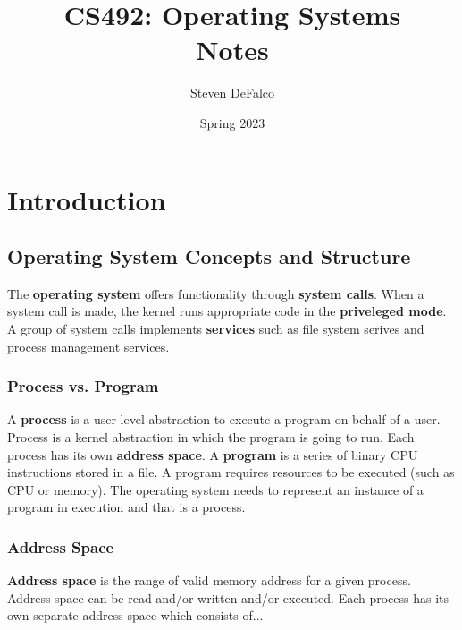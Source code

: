 \documentclass{article}
\title{CS492: Operating Systems \\ Notes}
\author{Steven DeFalco}
\date{Spring 2023}
\begin{document}
\renewcommand{\i}{\item}
\newcommand{\bl}{\begin{itemize}}
\newcommand{\el}{\end{itemize}}
\renewcommand{\b}[1]{\textbf{#1}}

\maketitle

\tableofcontents

\newpage

\section{Introduction}

\subsection{Operating System Concepts and Structure}

    The \textbf{operating system} offers functionality through \textbf{system calls}. When a system call is made, the kernel runs appropriate code in the \textbf{priveleged mode}. \\

    \noindent A group of system calls implements \textbf{services} such as file system serives and process management services. \\

    \subsubsection{Process vs. Program}

    \noindent A \textbf{process} is a user-level abstraction to execute a program on behalf of a user. Process is a kernel abstraction in which the program is going to run. Each process has its own \textbf{address space}. A \textbf{program} is a series of binary CPU instructions stored in a file. A program requires resources to be executed (such as CPU or memory). The operating system needs to represent an instance of a program in execution and that is a process. 

    \subsubsection{Address Space}

    \noindent \textbf{Address space} is the range of valid memory address for a given process. Address space can be read and/or written and/or executed. Each process has its own separate address space which consists of...
    
\end{document}
